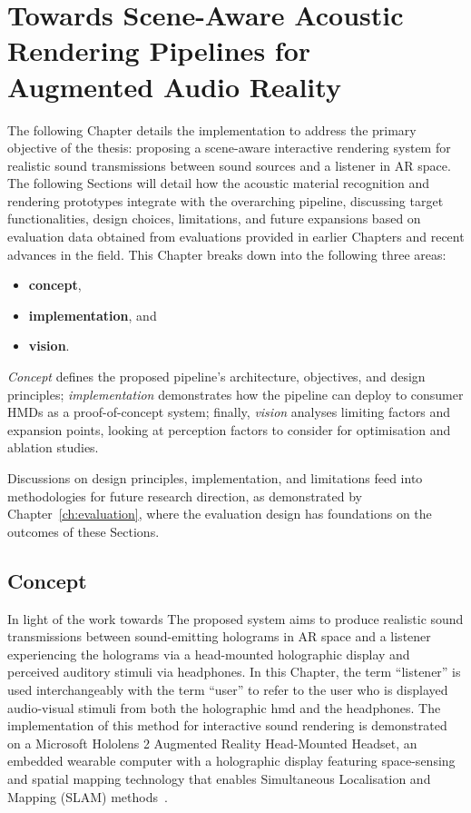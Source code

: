 \chapter{Towards Scene-Aware Acoustic Rendering Pipelines for Augmented Audio Reality}\label{ch:ar-pipeline}
The following Chapter details the implementation to address the primary objective of the thesis: proposing a scene-aware interactive rendering system for realistic sound transmissions between sound sources and a listener in AR space. The following Sections will detail how the acoustic material recognition and rendering prototypes integrate with the overarching pipeline, discussing target functionalities, design choices, limitations, and future expansions based on evaluation data obtained from evaluations provided in earlier Chapters and recent advances in the field. This Chapter breaks down into the following three areas:
\begin{itemize}
    \item \textbf{concept},
    \item \textbf{implementation}, and
    \item \textbf{vision}.
\end{itemize}
\emph{Concept} defines the proposed pipeline's architecture, objectives, and design principles; \emph{implementation} demonstrates how the pipeline can deploy to consumer HMDs as a proof-of-concept system; finally, \emph{vision} analyses limiting factors and expansion points, looking at perception factors to consider for optimisation and ablation studies.\par
Discussions on design principles, implementation, and limitations feed into methodologies for future research direction, as demonstrated by Chapter~\ref{ch:evaluation}, where the evaluation design has foundations on the outcomes of these Sections.

\section{Concept}\label{sec:overview}
In light of the work towards 
The proposed system aims to produce realistic sound transmissions between sound-emitting holograms in AR space and a listener experiencing the holograms via a head-mounted holographic display and perceived auditory stimuli via headphones. In this Chapter, the term ``listener'' is used interchangeably with the term ``user'' to refer to the user who is displayed audio-visual stimuli from both the holographic \acrshort{hmd} and the headphones. The implementation of this method for interactive sound rendering is demonstrated on a Microsoft Hololens 2 Augmented Reality Head-Mounted Headset, an embedded wearable computer with a holographic display featuring space-sensing and spatial mapping technology that enables Simultaneous Localisation and Mapping (SLAM) methods~\citep{davison2003real, ungureanu2020hololens}.\par

